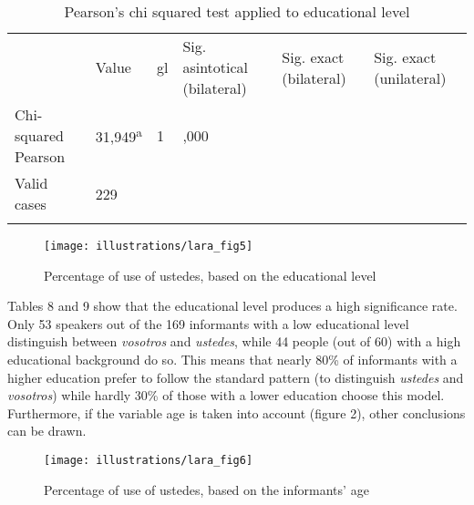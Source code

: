 \documentclass[output=paper]{LSP/langsci}
\begin{document}
\begin{table}
\begin{tabular}{llllll}
\lsptoprule
\multicolumn{6}{c}{\bfseries Pearson’s chi squared}\\
\midrule
& Value & gl & 
\begin{minipage}[t]{0.15\textwidth}Sig. asintotical (bilateral)\end{minipage} & 
\begin{minipage}[t]{0.15\textwidth}Sig. exact (bilateral)\end{minipage} & 
\begin{minipage}[t]{0.15\textwidth}Sig. exact (unilateral)\end{minipage} \\
\midrule
\begin{minipage}[t]{0.15\textwidth}Chi-squared Pearson\end{minipage} & 31,949\textsuperscript{a} & 1 & ,000 &  & \\
\begin{minipage}[t]{0.15\textwidth}Valid cases\end{minipage} & 229 &  &  &  & \\
\lspbottomrule
\end{tabular}
\label{tab:9}
\caption{Pearson’s chi squared test applied to educational level} 
\end{table}

\begin{figure}
\texttt{[image: illustrations/lara\_fig5]}
\label{fig:5}
\caption{Percentage of use of ustedes, based on the educational level}
\end{figure}

Tables 8 and 9 show that the educational level produces a high significance rate. Only 53 speakers out of the 169 informants with a low educational level distinguish between \textit{vosotros} and \textit{ustedes}, while 44 people (out of 60) with a high educational background do so. This means that nearly 80\% of informants with a higher education prefer to follow the standard pattern (to distinguish \textit{ustedes} and \textit{vosotros}) while hardly 30\% of those with a lower education choose this model. Furthermore, if the variable age is taken into account (figure 2), other conclusions can be drawn.

\begin{figure}
\texttt{[image: illustrations/lara\_fig6]}
\label{fig:6}
\caption{Percentage of use of ustedes, based on the informants' age}
\end{figure}
\end{document}
